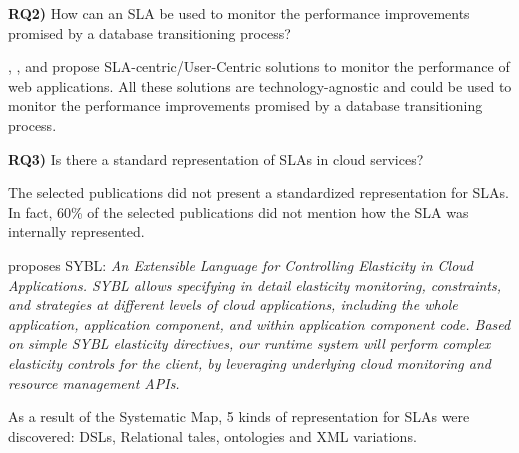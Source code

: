 \documentclass{article}
\begin{document}
\textbf{RQ2)} How can an SLA be used to monitor the performance improvements promised by a database transitioning process?

\cite{6253526}, \cite{6461875}, \cite{6511780} and \cite{Xiong:2011:APA:2038916.2038931} propose SLA-centric/User-Centric solutions to monitor the performance of web applications. All these solutions are technology-agnostic and could be used to monitor the performance improvements promised by a database transitioning process.

\textbf{RQ3)} Is there a standard representation of SLAs in cloud services? 

The selected publications did not present a standardized representation for SLAs. In fact, 60\% of the selected publications did not mention how the SLA was internally represented. 

\cite{6546068} proposes SYBL: \textit{An Extensible Language for Controlling Elasticity in Cloud Applications. SYBL allows specifying in detail elasticity monitoring, constraints, and strategies at different levels of cloud applications, including the whole application, application component, and within application component code. Based on simple SYBL elasticity directives, our runtime system will perform complex elasticity controls for the client, by leveraging underlying cloud monitoring and resource management APIs.}

As a result of the Systematic Map, 5 kinds of representation for SLAs were discovered: DSLs, Relational tales, ontologies and XML variations.



	
\end{document}
